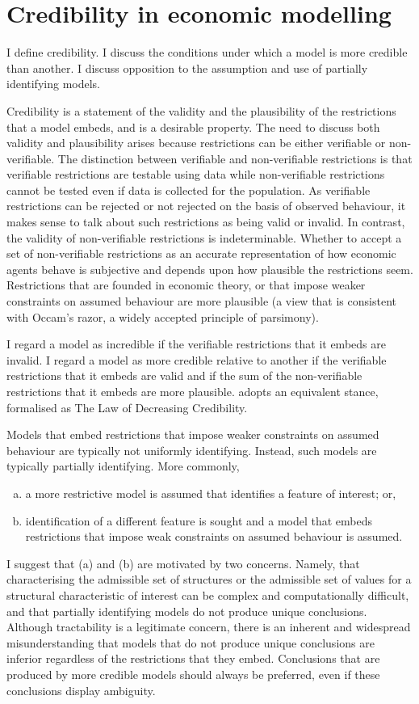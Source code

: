 \documentclass[10pt,a4paper,twoside]{article}
\numberwithin{equation}{section}
\begin{document}
\section{Credibility in economic modelling}
I define credibility. I discuss the conditions under which a model is more credible than another. I discuss opposition to the assumption and use of partially identifying models.

Credibility is a statement of the validity and the plausibility of the restrictions that a model embeds, and is a desirable property. The need to discuss both validity and plausibility arises because restrictions can be either verifiable or non-verifiable. The distinction between verifiable and non-verifiable restrictions is that verifiable restrictions are testable using data while non-verifiable restrictions cannot be tested even if data is collected for the population. As verifiable restrictions can be rejected or not rejected on the basis of observed behaviour, it makes sense to talk about such restrictions as being valid or invalid. In contrast, the validity of non-verifiable restrictions is indeterminable. Whether to accept a set of non-verifiable restrictions as an accurate representation of how economic agents behave is subjective and depends upon how plausible the restrictions seem. Restrictions that are founded in economic theory, or that impose weaker constraints on assumed behaviour are more plausible (a view that is consistent with Occam's razor, a widely accepted principle of parsimony).      

I regard a model as incredible if the verifiable restrictions that it embeds are invalid. I regard a model as more credible relative to another if the verifiable restrictions that it embeds are valid and if the sum of the non-verifiable restrictions that it embeds are more plausible. \cite{book.manski} adopts an equivalent stance, formalised as The Law of Decreasing Credibility. 

Models that embed restrictions that impose weaker constraints on assumed behaviour are typically not uniformly identifying. Instead, such models are typically partially identifying. More commonly, 
\begin{enumerate}[(a)]
\item a more restrictive model is assumed that identifies a feature of interest; or,
\item identification of a different feature is sought and a model that embeds restrictions that impose weak constraints on assumed behaviour is assumed.
\end{enumerate}
I suggest that (a) and (b) are motivated by two concerns. Namely, that characterising the admissible set of structures or the admissible set of values for a structural characteristic of interest can be complex and computationally difficult, and that partially identifying models do not produce unique conclusions. Although tractability is a legitimate concern, there is an inherent and widespread misunderstanding that models that do not produce unique conclusions are inferior regardless of the restrictions that they embed. Conclusions that are produced by more credible models should always be preferred, even if these conclusions display ambiguity. 
\end{document}

